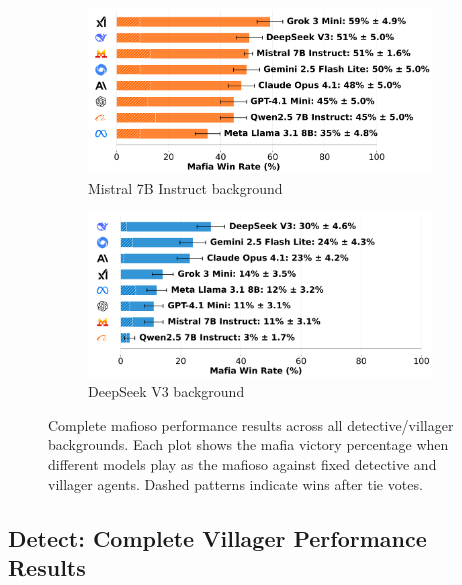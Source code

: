 \documentclass{article}
\begin{document}
\begin{figure}[htbp]
    \begin{subfigure}[b]{0.48\textwidth}
        \centering
        \includegraphics[width=\textwidth]{../results/mafioso_mistral_7b_instruct_db_benchmark.png}
        \caption{Mistral 7B Instruct background}
        \label{fig:mafioso_mistral_appendix}
    \end{subfigure}
    \hfill
    \begin{subfigure}[b]{0.48\textwidth}
        \centering
        \includegraphics[width=\textwidth]{../results/mafioso_deepseek_v3_db_benchmark.png}
        \caption{DeepSeek V3 background}
        \label{fig:mafioso_deepseek_appendix}
    \end{subfigure}
    \caption{Complete mafioso performance results across all detective/villager backgrounds. Each plot shows the mafia victory percentage when different models play as the mafioso against fixed detective and villager agents. Dashed patterns indicate wins after tie votes.}
    \label{fig:mafioso_complete}
\end{figure}

\subsection{Detect: Complete Villager Performance Results}
\end{document}
